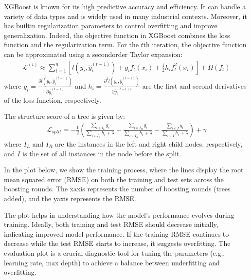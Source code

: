 \documentclass[letterpaper,10pt,english]{jupyterBook}
\begin{document}
\sphinxAtStartPar
XGBoost is known for its high predictive accuracy and efficiency. It can handle a variety of data types and is widely used in many industrial contexts. Moreover, it has built\sphinxhyphen{}in regularization parameters to control overfitting and improve generalization. Indeed, the objective function in XGBoost combines the loss function and the regularization term. For the \(t\)\sphinxhyphen{}th iteration, the objective function can be approximated using a second\sphinxhyphen{}order Taylor expansion:
\begin{equation*}
\begin{split}
\mathcal{L}^{(t)} \approx \sum_{i=1}^{n} [l(y_i, \hat{y}_i^{(t-1)}) + g_i f_t(x_i) + \frac{1}{2} h_i f_t^2(x_i)] + \Omega(f_t)
\end{split}
\end{equation*}
\sphinxAtStartPar
where \(g_i = \frac{\partial l(y_i, \hat{y}_i^{(t-1)})}{\partial \hat{y}_i^{(t-1)}}\) and \(h_i = \frac{\partial^2 l(y_i, \hat{y}_i^{(t-1)})}{\partial \hat{y}_i^{(t-1)2}}\) are the first and second derivatives of the loss function, respectively.

\sphinxAtStartPar
The structure score of a tree is given by:
\begin{equation*}
\begin{split}
\mathcal{L}_{split} = -\frac{1}{2} \left( \frac{\sum_{i \in I_L} g_i}{\sum_{i \in I_L} h_i + \lambda} + \frac{\sum_{i \in I_R} g_i}{\sum_{i \in I_R} h_i + \lambda} - \frac{\sum_{i \in I} g_i}{\sum_{i \in I} h_i + \lambda} \right) + \gamma
\end{split}
\end{equation*}
\sphinxAtStartPar
where \(I_L\) and \(I_R\) are the instances in the left and right child nodes, respectively, and \(I\) is the set of all instances in the node before the split.

\sphinxAtStartPar
In the plot below, we show the training process, where the lines display the root mean squared error (RMSE) on both the training and test sets across the boosting rounds. The x\sphinxhyphen{}axis represents the number of boosting rounds (trees added), and the y\sphinxhyphen{}axis represents the RMSE.

\sphinxAtStartPar
The plot helps in understanding how the model’s performance evolves during training. Ideally, both training and test RMSE should decrease initially, indicating improved model performance. If the training RMSE continues to decrease while the test RMSE starts to increase, it suggests overfitting. The evaluation plot is a crucial diagnostic tool for tuning the parameters (e.g., learning rate, max depth) to achieve a balance between underfitting and overfitting.
\end{document}

